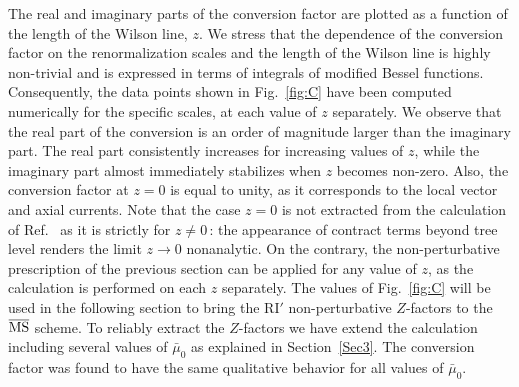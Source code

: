 \medskip
The real and imaginary parts of the conversion factor are plotted as a function of the length of the Wilson
line, $z$. We stress that the dependence of the conversion factor on the renormalization scales and the length of the
Wilson line is highly non-trivial and is expressed in terms of integrals of modified Bessel functions. Consequently, the data points
shown in Fig.~\ref{fig:C} have been computed numerically for the specific scales, at each value of $z$ separately. We observe
that the real part of the conversion is an order of magnitude larger than the imaginary part. The real part consistently increases
for increasing values of $z$, while the imaginary part almost immediately stabilizes when $z$ becomes non-zero. Also, the conversion
factor at $z{=}0$ is equal to unity, as it corresponds to the local vector and axial currents. Note that the case $z{=}0$ is not extracted
from the calculation of Ref.~\cite{Constantinou:2017sej} as it is strictly for $z{\neq}0$\,: the appearance of contract terms beyond
tree level renders the limit $z\to 0$ nonanalytic. On the contrary, the non-perturbative prescription of the previous section
can be applied for any value of $z$, as the calculation is performed on each $z$ separately. The values of Fig.~\ref{fig:C} will be used
in the following section to bring the RI$'$ non-perturbative $Z$-factors to the ${\overline{\rm MS}}$ scheme. To reliably extract
the $Z$-factors we have extend the calculation including several values of $\bar\mu_0$ as explained in Section~\ref{Sec3}. The conversion
factor was found to have the same qualitative behavior for all values of $\bar\mu_0$.
